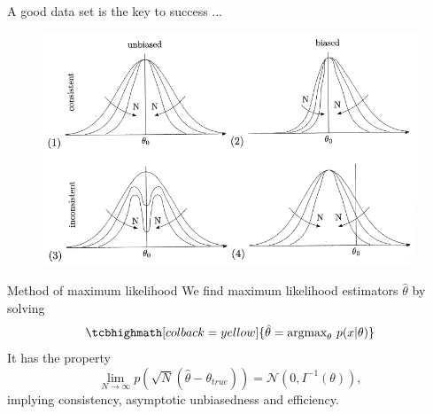 \documentclass[
aspectratio=169,
14pt,
professionalfonts
]{beamer}
\begin{document}
\begin{frame}{A good data set is the key to success ...}
    \begin{figure}
    \centering
    \includegraphics[width=0.8\linewidth]{../plots/estimator.pdf}
\end{figure}
\end{frame}

\begin{frame}{Method of maximum likelihood}
    \vspace{-0.2cm}
    We find maximum likelihood estimators $ \hat \theta$ by solving
    $$
    \tcbhighmath[colback=yellow]{
        \hat \theta = \text{argmax}_\theta ~ p(x|\theta)
    }
    $$
    It has the property
    $$
    \lim_{N \to \infty} p\left(\sqrt{N}(\hat \theta - \theta_{true})\right) = \mathcal{N}\left(0, I^{-1}(\theta)\right),
    $$
    implying consistency, asymptotic unbiasedness and efficiency.
\end{frame}

\end{document}
